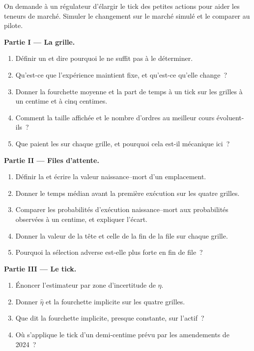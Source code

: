\begin{problem}\label{pb:mx:tick-size-queues-and-priority:1}
On demande à un régulateur d'élargir le tick des petites actions pour aider les teneurs de marché. Simuler le changement sur le marché simulé et le comparer au pilote.

\medskip\noindent\textbf{Partie I --- La grille.}
\begin{enumerate}
\item Définir un  et dire pourquoi le  ne suffit pas à le déterminer.
\item Qu'est-ce que l'expérience maintient fixe, et qu'est-ce qu'elle change~?
\item Donner la fourchette moyenne et la part de temps à un tick sur les grilles à un centime et à cinq centimes.
\item Comment la taille affichée et le nombre d'ordres au meilleur cours évoluent-ils~?
\item Que paient les  sur chaque grille, et pourquoi cela est-il mécanique ici~?
\end{enumerate}

\medskip\noindent\textbf{Partie II --- Files d'attente.}
\begin{enumerate}[resume]
\item Définir la  et écrire la valeur naissance--mort d'un emplacement.
\item Donner le temps médian avant la première exécution sur les quatre grilles.
\item Comparer les probabilités d'exécution naissance--mort aux probabilités observées à un centime, et expliquer l'écart.
\item Donner la valeur de la tête et celle de la fin de la file sur chaque grille.
\item Pourquoi la sélection adverse est-elle plus forte en fin de file~?
\end{enumerate}

\medskip\noindent\textbf{Partie III --- Le tick.}
\begin{enumerate}[resume]
\item Énoncer l'estimateur par zone d'incertitude de $\eta$.
\item Donner $\hat\eta$ et la fourchette implicite sur les quatre grilles.
\item Que dit la fourchette implicite, presque constante, sur l'actif~?
\item Où s'applique le tick d'un demi-centime prévu par les amendements de 2024~?
\end{enumerate}


\end{problem}
